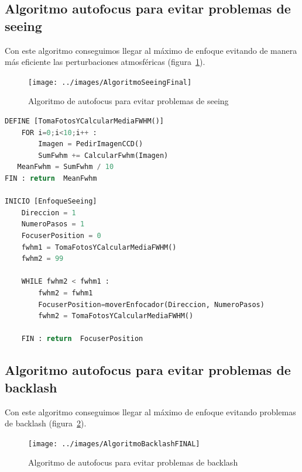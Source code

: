 \subsection{Algoritmo autofocus para evitar problemas de seeing}

Con este algoritmo conseguimos llegar al máximo de enfoque evitando de manera más eficiente las perturbaciones atmosféricas (figura~\ref{fig:Algoritmo3-Focuser}).

\begin{figure}[]
	\centering
	\texttt{[image: ../images/AlgoritmoSeeingFinal]}
	\caption[Algoritmo de autofocus (seeing)]{Algoritmo de autofocus para evitar problemas de seeing}
	\label{fig:Algoritmo3-Focuser}
\end{figure}

\begin{lstlisting}[language=python]
DEFINE [TomaFotosYCalcularMediaFWHM()]
    FOR i=0;i<10;i++ :  
        Imagen = PedirImagenCCD()
        SumFwhm += CalcularFwhm(Imagen)
   MeanFwhm = SumFwhm / 10
FIN : return  MeanFwhm

INICIO [EnfoqueSeeing]
    Direccion = 1
    NumeroPasos = 1
    FocuserPosition = 0
    fwhm1 = TomaFotosYCalcularMediaFWHM()
    fwhm2 = 99
    
    WHILE fwhm2 < fwhm1 :
        fwhm2 = fwhm1
        FocuserPosition=moverEnfocador(Direccion, NumeroPasos)
        fwhm2 = TomaFotosYCalcularMediaFWHM()
        
    FIN : return  FocuserPosition   
\end{lstlisting} 





\subsection{Algoritmo autofocus para evitar problemas de backlash}

Con este algoritmo conseguimos llegar al máximo de enfoque evitando problemas de backlash (figura~\ref{fig:Algoritmo4-Focuser}).

\begin{figure}[]
	\centering
	\texttt{[image: ../images/AlgoritmoBacklashFINAL]}
	\caption[Algoritmo de autofocus (backlash)]{Algoritmo de autofocus para evitar problemas de backlash}
	\label{fig:Algoritmo4-Focuser}
\end{figure}

